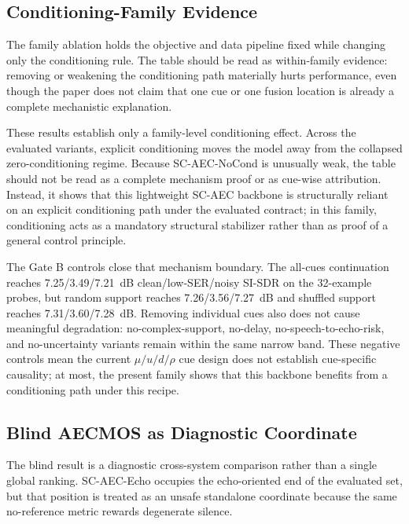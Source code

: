 \documentclass[journal]{IEEEtran}
\begin{document}
\subsection{Conditioning-Family Evidence}
The family ablation holds the objective and data pipeline fixed while changing only the conditioning rule. The table should be read as within-family evidence: removing or weakening the conditioning path materially hurts performance, even though the paper does not claim that one cue or one fusion location is already a complete mechanistic explanation.



These results establish only a family-level conditioning effect. Across the evaluated variants, explicit conditioning moves the model away from the collapsed zero-conditioning regime. Because SC-AEC-NoCond is unusually weak, the table should not be read as a complete mechanism proof or as cue-wise attribution. Instead, it shows that this lightweight SC-AEC backbone is structurally reliant on an explicit conditioning path under the evaluated contract; in this family, conditioning acts as a mandatory structural stabilizer rather than as proof of a general control principle.



The Gate B controls close that mechanism boundary. The all-cues continuation reaches 7.25/3.49/7.21~dB clean/low-SER/noisy SI-SDR on the 32-example probes, but random support reaches 7.26/3.56/7.27~dB and shuffled support reaches 7.31/3.60/7.28~dB. Removing individual cues also does not cause meaningful degradation: no-complex-support, no-delay, no-speech-to-echo-risk, and no-uncertainty variants remain within the same narrow band. These negative controls mean the current $\mu/u/d/\rho$ cue design does not establish cue-specific causality; at most, the present family shows that this backbone benefits from a conditioning path under this recipe.

\subsection{Blind AECMOS as Diagnostic Coordinate}
The blind result is a diagnostic cross-system comparison rather than a single global ranking. SC-AEC-Echo occupies the echo-oriented end of the evaluated set, but that position is treated as an unsafe standalone coordinate because the same no-reference metric rewards degenerate silence.
\end{document}
